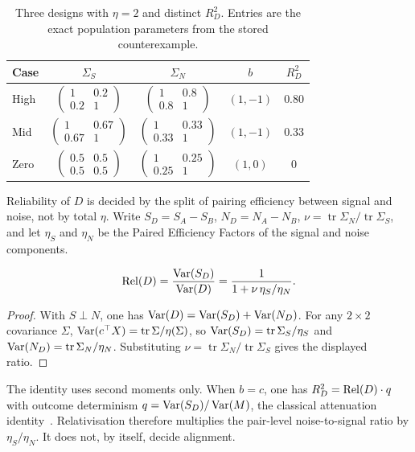 \begin{table}[t]
  \centering
  \caption{Three designs with $\eta=2$ and distinct $R^2_D$.
           Entries are the exact population parameters from the stored counterexample.}
  \label{tab:eta2}
  \begin{tabular}{@{}lcccc@{}}
    \toprule
    Case & $\Sigma_S$ & $\Sigma_N$ & $b$ & $R^2_D$ \\
    \midrule
    High &
      $\begin{pmatrix}1&0.2\\0.2&1\end{pmatrix}$ &
      $\begin{pmatrix}1&0.8\\0.8&1\end{pmatrix}$ &
      $(1,-1)$ & $0.80$ \\
    Mid &
      $\begin{pmatrix}1&0.67\\0.67&1\end{pmatrix}$ &
      $\begin{pmatrix}1&0.33\\0.33&1\end{pmatrix}$ &
      $(1,-1)$ & $0.33$ \\
    Zero &
      $\begin{pmatrix}0.5&0.5\\0.5&0.5\end{pmatrix}$ &
      $\begin{pmatrix}1&0.25\\0.25&1\end{pmatrix}$ &
      $(1,0)$ & $0$ \\
    \bottomrule
  \end{tabular}
\end{table}

Reliability of $D$ is decided by the split of pairing efficiency between signal and noise, not by total $\eta$.
Write $S_D=S_A-S_B$, $N_D=N_A-N_B$, $\nu=\operatorname{tr}\Sigma_N/\operatorname{tr}\Sigma_S$, and let $\eta_S$ and $\eta_N$ be the Paired Efficiency Factors of the signal and noise components.

\begin{theorem}[Reliability]
\label{thm:reliability}
\[
  \operatorname{Rel}(D)
  = \frac{\operatorname{Var}(S_D)}{\operatorname{Var}(D)}
  = \frac{1}{1+\nu\,\eta_S/\eta_N}.
\]
\end{theorem}

\begin{proof}
With $S\perp N$, one has $\operatorname{Var}(D)=\operatorname{Var}(S_D)+\operatorname{Var}(N_D)$.
For any $2\times 2$ covariance $\Sigma$, $\operatorname{Var}(c^\top X)=\operatorname{tr}\Sigma/\eta(\Sigma)$, so $\operatorname{Var}(S_D)=\operatorname{tr}\Sigma_S/\eta_S$ and $\operatorname{Var}(N_D)=\operatorname{tr}\Sigma_N/\eta_N$.
Substituting $\nu=\operatorname{tr}\Sigma_N/\operatorname{tr}\Sigma_S$ gives the displayed ratio.
\end{proof}

The identity uses second moments only.
When $b=c$, one has $R^2_D=\operatorname{Rel}(D)\cdot q$ with outcome determinism $q=\operatorname{Var}(S_D)/\operatorname{Var}(M)$, the classical attenuation identity~\parencite{fuller1987}.
Relativisation therefore multiplies the pair-level noise-to-signal ratio by $\eta_S/\eta_N$.
It does not, by itself, decide alignment.
